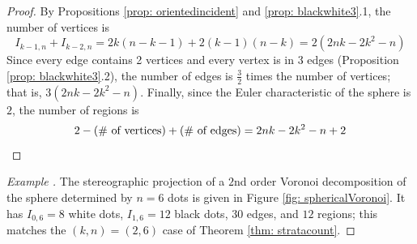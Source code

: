 \documentclass[11pt,oneside]{amsart}
\theoremstyle{definition}
\theoremstyle{remark}
\newenvironment{ex}{\refstepcounter{thm}\begin{proof}[Example \emph{\thethm}]\renewcommand*{\qedsymbol}{\(\blacksquare\)}}{\end{proof}}
\numberwithin{equation}{section}
\begin{document}
\begin{proof}
By Propositions \ref{prop: orientedincident} and \ref{prop: blackwhite3}.1, the number of vertices is
\[
I_{k-1,n} + I_{k-2,n} = 2k(n-k-1) + 2(k-1)(n-k) = 2(2nk-2k^2 -n)
\]
Since every edge contains 2 vertices and every vertex is in 3 edges (Proposition \ref{prop: blackwhite3}.2), the number of edges is $\frac{3}{2}$ times the number of vertices; that is, $3(2nk-2k^2 -n)$.
Finally, since the Euler characteristic of the sphere is $2$, the number of regions is
\[
2 - \text{(\# of vertices}) + \text{(\# of edges)} = 2nk - 2k^2 - n + 2
\qedhere
\]
\end{proof}


\begin{ex}
The stereographic projection of a $2$nd order Voronoi decomposition of the sphere determined by $n=6$ dots is given in Figure \ref{fig: sphericalVoronoi}. It has
$I_{0,6}= 8$ white dots, $I_{1,6} =12$ black dots, $30$ edges, and $12$ regions; this matches the $(k,n)=(2,6)$ case of Theorem \ref{thm: stratacount}.
\end{ex}



\end{document}
